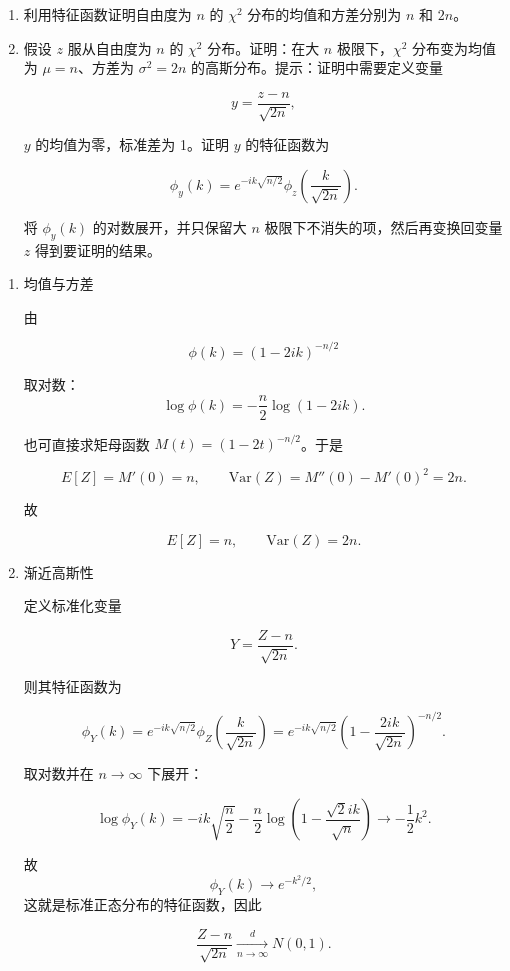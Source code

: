\begin{question}
\begin{enumerate}
\item 利用特征函数证明自由度为 \(n\) 的 \(\chi^2\) 分布的均值和方差分别为
\(n\) 和 \(2n\)。

\item 假设 \(z\) 服从自由度为 \(n\) 的 \(\chi^2\) 分布。证明：在大 \(n\)
极限下，\(\chi^2\) 分布变为均值为 \(\mu=n\)、方差为 \(\sigma^2=2n\)
的高斯分布。提示：证明中需要定义变量

\[
y=\frac{z-n}{\sqrt{2n}},
\]

\(y\) 的均值为零，标准差为 1。证明 \(y\) 的特征函数为

\[
\phi_y(k)=e^{-ik\sqrt{n/2}}\phi_z\left(\frac{k}{\sqrt{2n}}\right).
\]

将 \(\phi_y(k)\) 的对数展开，并只保留大 \(n\)
极限下不消失的项，然后再变换回变量 \(z\) 得到要证明的结果。
\end{enumerate}
\begin{solution}
\begin{enumerate}
\item 均值与方差

由

\[
\phi(k)=(1-2ik)^{-n/2}
\]

取对数： \[
\log \phi(k)=-\frac n2 \log(1-2ik).
\]

也可直接求矩母函数 \(M(t)=(1-2t)^{-n/2}\)。于是

\[
E[Z]=M'(0)=n,\qquad \mathrm{Var}(Z)=M''(0)-M'(0)^2=2n.
\]

故

\[
E[Z]=n,\qquad \mathrm{Var}(Z)=2n.
\]

\item 渐近高斯性

定义标准化变量

\[
Y=\frac{Z-n}{\sqrt{2n}}.
\]

则其特征函数为

\[
\phi_Y(k)=e^{-ik\sqrt{n/2}}\phi_Z\!\left(\frac{k}{\sqrt{2n}}\right)
=e^{-ik\sqrt{n/2}}\left(1-\frac{2ik}{\sqrt{2n}}\right)^{-n/2}.
\]

取对数并在 \(n\to\infty\) 下展开：

\[
\log\phi_Y(k)
=
-ik\sqrt{\frac n2}
-\frac n2 \log\!\left(1-\frac{\sqrt{2}ik}{\sqrt n}\right)
\to -\frac12 k^2.
\]

故 \[
\phi_Y(k)\to e^{-k^2/2},
\] 这就是标准正态分布的特征函数，因此

\[
\frac{Z-n}{\sqrt{2n}}\xrightarrow[n\to\infty]{d}N(0,1).
\]
\end{enumerate}
\end{solution}
\end{question}



